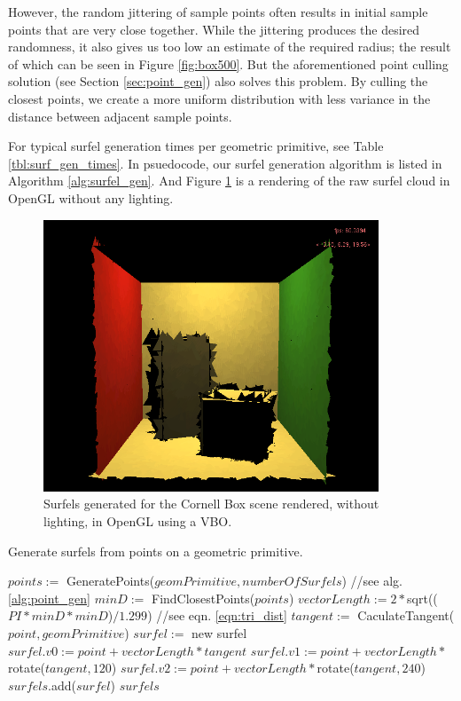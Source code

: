 However, the random jittering of sample points often results in initial sample points that are very close together. While the jittering produces the desired randomness, it also gives us too low an estimate of the required radius; the result of which can be seen in Figure \ref{fig:box500}. But the aforementioned point culling solution (see Section \ref{sec:point_gen}) also solves this problem. By culling the closest points, we create a more uniform distribution with less variance in the distance between adjacent sample points.

For typical surfel generation times per geometric primitive, see Table \ref{tbl:surf_gen_times}. In psuedocode, our surfel generation algorithm is listed in Algorithm \ref{alg:surfel_gen}. And Figure \ref{fig:surfel_cloud_simple} is a rendering of the raw surfel cloud in OpenGL without any lighting.

\begin{figure}
   \centering
   \includegraphics[width=100mm]{../img/surfel_cloud_simple.png}
   \captionfonts
   \caption[OpenGL Cornell Box surfel cloud]{Surfels generated for the Cornell Box scene rendered, without lighting, in OpenGL using a VBO.}
   \label{fig:surfel_cloud_simple}
\end{figure}

\begin{algorithm}[H]
\captionfont
\caption[Surfel generation]{Generate surfels from points on a geometric primitive.}
\label{alg:surfel_gen}
{\fontsize{10}{9}\selectfont
\begin{algorithmic}
      \State $points :=$ GeneratePoints($geomPrimitive, numberOfSurfels$) //see alg. \ref{alg:point_gen}
      \State $minD :=$ FindClosestPoints($points$)
      \State $vectorLength := 2 * $sqrt(($PI * minD * minD$)$ / 1.299$) //see eqn. \ref{eqn:tri_dist}
         \State $tangent :=$ CaculateTangent($point, geomPrimitive$)
         \State $surfel :=$ new surfel
         \State $surfel.v0 := point + vectorLength * tangent$
         \State $surfel.v1 := point + vectorLength * $rotate($tangent, 120$)
         \State $surfel.v2 := point + vectorLength * $rotate($tangent, 240$)
         \State $surfels$.add($surfel$)
      \EndFor
      \State \Return $surfels$
   \EndFunction
\end{algorithmic}
}
\end{algorithm}

